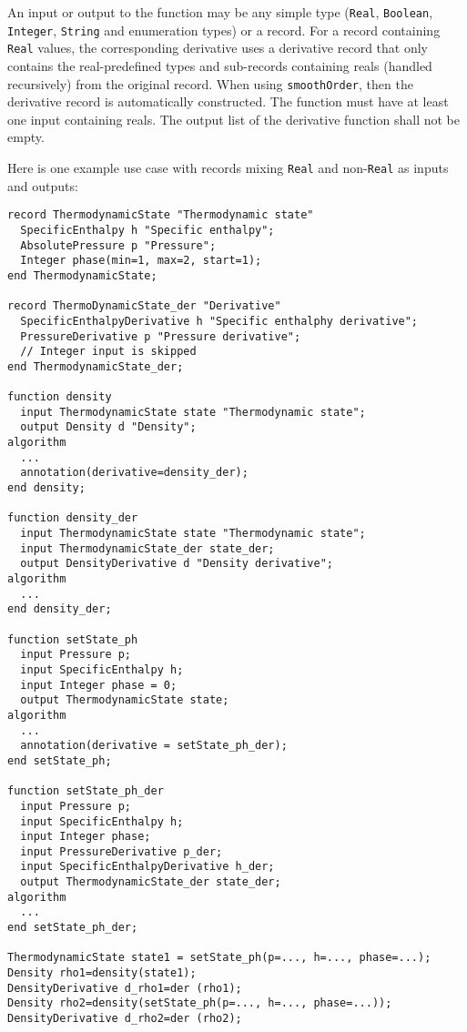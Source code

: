 An input or output to the function may be any simple type (\lstinline!Real!, \lstinline!Boolean!, \lstinline!Integer!, \lstinline!String! and enumeration types) or a record.
For a record containing \lstinline!Real! values, the corresponding derivative uses a derivative record that only contains the real-predefined types and sub-records containing reals (handled recursively) from the original record.
When using \lstinline!smoothOrder!, then the derivative record is automatically constructed.
The function must have at least one input containing reals.
The output list of the derivative function shall not be empty.

\begin{example}
Here is one example use case with records mixing \lstinline!Real! and
non-\lstinline!Real! as inputs and outputs:
\begin{lstlisting}[language=modelica]
record ThermodynamicState "Thermodynamic state"
  SpecificEnthalpy h "Specific enthalpy";
  AbsolutePressure p "Pressure";
  Integer phase(min=1, max=2, start=1);
end ThermodynamicState;

record ThermoDynamicState_der "Derivative"
  SpecificEnthalpyDerivative h "Specific enthalphy derivative";
  PressureDerivative p "Pressure derivative";
  // Integer input is skipped
end ThermodynamicState_der;

function density
  input ThermodynamicState state "Thermodynamic state";
  output Density d "Density";
algorithm
  ...
  annotation(derivative=density_der);
end density;

function density_der
  input ThermodynamicState state "Thermodynamic state";
  input ThermodynamicState_der state_der;
  output DensityDerivative d "Density derivative";
algorithm
  ...
end density_der;

function setState_ph
  input Pressure p;
  input SpecificEnthalpy h;
  input Integer phase = 0;
  output ThermodynamicState state;
algorithm
  ...
  annotation(derivative = setState_ph_der);
end setState_ph;

function setState_ph_der
  input Pressure p;
  input SpecificEnthalpy h;
  input Integer phase;
  input PressureDerivative p_der;
  input SpecificEnthalpyDerivative h_der;
  output ThermodynamicState_der state_der;
algorithm
  ...
end setState_ph_der;

ThermodynamicState state1 = setState_ph(p=..., h=..., phase=...);
Density rho1=density(state1);
DensityDerivative d_rho1=der (rho1);
Density rho2=density(setState_ph(p=..., h=..., phase=...));
DensityDerivative d_rho2=der (rho2);
\end{lstlisting}
\end{example}

